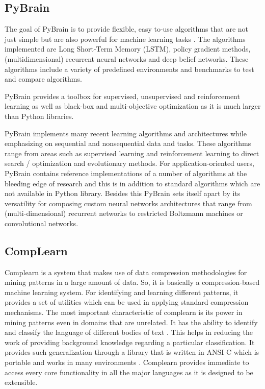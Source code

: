 \subsection{PyBrain}

  The goal of PyBrain is to provide flexible,
  easy to-use algorithms that are not just simple but are also powerful
  for machine learning tasks \cite{article-pybrain}.
  The algorithms implemented are Long
  Short-Term Memory (LSTM), policy gradient methods, (multidimensional)
  recurrent neural networks and deep belief networks. These algorithms
  include a variety of predefined environments and benchmarks to test
  and compare algorithms.

    PyBrain provides a toolbox for supervised, unsupervised and
    reinforcement learning as well as black-box and multi-objective
    optimization as it is much larger than Python libraries.

    PyBrain implements many recent learning algorithms and
    architectures while emphasizing on sequential and nonsequential
    data and tasks. These algorithms range from areas such as
    supervised learning and reinforcement learning to direct search /
    optimization and evolutionary methods.  For application-oriented
    users, PyBrain contains reference implementations of a number of
    algorithms at the bleeding edge of research and this is in
    addition to standard algorithms which are not available in Python
    library. Besides this PyBrain sets itself apart by its versatility
    for composing custom neural networks architectures that range from
    (multi-dimensional) recurrent networks to restricted Boltzmann
    machines or convolutional networks.

    \pv
    
\subsection{CompLearn}

    Complearn is a system that makes use of data compression
    methodologies for mining patterns in a large amount of data. So,
    it is basically a compression-based machine learning system. For
    identifying and learning different patterns, it provides a set of
    utilities which can be used in applying standard compression
    mechanisms. The most important characteristic of complearn is its
    power in mining patterns even in domains that are unrelated. It
    has the ability to identify and classify the language of different
    bodies of text \cite{comp1}. This helps in reducing the work of
    providing background knowledge regarding a particular
    classification. It provides such generalization through a library
    that is written in ANSI C which is portable and works in many
    environments \cite{comp1}. Complearn provides immediate to access
    every core functionality in all the major languages as it is
    designed to be extensible.

